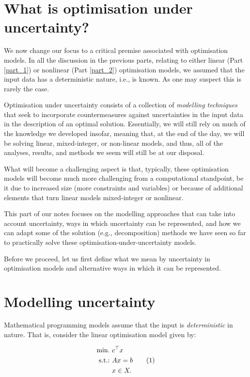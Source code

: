 \section{What is optimisation under uncertainty?}

We now change our focus to a critical premise associated with optimisation models. In all the discussion in the previous parts, relating to either linear (Part \ref{part_1}) or nonlinear (Part \ref{part_2}) optimisation models, we assumed that the input data has a deterministic nature, i.e., is known. As one may suspect this is rarely the case. 

Optimisation under uncertainty consists of a collection of \emph{modelling techniques} that seek to incorporate countermeasures against uncertainties in the input data in the description of an optimal solution. Essentially, we will still rely on much of the knowledge we developed insofar, meaning that, at the end of the day, we will be solving linear, mixed-integer, or non-linear models, and thus, all of the analyses, results, and methods we seem will still be at our disposal.

What will become a challenging aspect is that, typically, these optimisation models will become much more challenging from a computational standpoint, be it due to increased size (more constraints and variables) or because of additional elements that turn linear models mixed-integer or nonlinear. 

This part of our notes focuses on the modelling approaches that can take into account uncertainty, ways in which uncertainty can be represented, and how we can adapt some of the solution (e.g., decomposition) methods we have seen so far to practically solve these optimisation-under-uncertainty models.

Before we proceed, let us first define what we mean by uncertainty in optimisation models and alternative ways in which it can be represented.

\section{Modelling uncertainty}

Mathematical programming models assume that the input is \emph{deterministic} in nature. That is, consider the linear optimisation model given by:

\begin{equation}
	\begin{aligned}
		\mathop{\text{min.~}} & c^\top x \\
		\mathop{\text{s.t.:~}}   & Ax = b \\
			  & x \in X.	
	\end{aligned}	
	\tag{1}
\end{equation}



